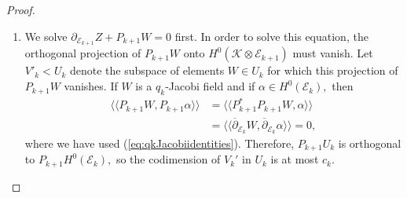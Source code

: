 \documentclass[10pt,a4paper]{amsart}
\newcommand{\delbar}{\overline{\partial}}
\newcommand{\del}{\partial}
\newcommand{\llangle}{\langle\!\langle}
\newcommand{\rrangle}{\rangle\!\rangle}
\begin{document}
\begin{proof}
\begin{enumerate}[label=(\alph*)]
        For $Z \in U_{k+1}',$ choose the solution $W$ of $\delbar_{\mathcal{E}_{k}} W - P^\dagger_{k+1} Z = 0$ with $W \in \ker(\delbar_{\mathcal{E}_{k}} )^\perp$ and let $Y = \del_{\mathcal{E}_{k+1}} Z + P_{k+1} W.$ Proposition \ref{prop:commutident} and (\ref{eq:qkJacobiidentities}) give
        \begin{equation*}
            \begin{aligned}
                \del^*_{\mathcal{E}_{k+1}} Y &= \del^*_{\mathcal{E}_{k+1}} \del_{\mathcal{E}_{k+1}} Z + \del^*_{\mathcal{E}_{k+1}} P_{k+1} W \\
                &= (P_{k+1}^\dagger)^* P_{k+1}^\dagger Z + \del^*_{\mathcal{E}_{k+1}} P_{k+1} W \\
                &= \left( (P_{k+1}^\dagger)^* \delbar_{\mathcal{E}_{k}} + \del^*_{\mathcal{E}_{k+1}} P_{k+1} \right) W = 0,
            \end{aligned}
        \end{equation*}
        so $Y \in H^0(\mathcal{K} \otimes \mathcal{E}_{k+1}).$ Replacing $W$ by $W+\tau$ with $\tau \in H^0(\mathcal{E}_k)$ changes $Y$ by $P_{k+1} \tau.$ Let $U''_{k+1}$ denote the subspace of $U_{k+1}'$ for which the class of $Y$ in ${H^0(\mathcal{K} \otimes \mathcal{E}_{k+1})}/{P_{k+1} H^0(\mathcal{E}_k)}$ is $0.$ The codimension of $U''_{k+1}$ in $U'_{k+1}$ is at most $c_k.$ Given $Z \in U_{k+1}'',$ we can find $W' \in \Gamma(\mathcal{E}_k)$ satisfying both equations in (\ref{eq:nullityextension}), unique up to an element in $\ker(\delbar_{\mathcal{E}_k}) \cap \ker(P_{k+1}) = H^0(\mathcal{A}_k).$ Therefore, by Lemma \ref{lem:ckdkcalc},
        \begin{equation}
            \nu_k \geq \nu_{k+1} - c_k - d_k + h^0(\mathcal{A}_k) = \nu_{k+1} + \chi(\mathcal{A}_k) - (n-k-1)b_{k+1}.
        \end{equation}
        
        \item We solve $\del_{\mathcal{E}_{k+1}} Z + P_{k+1} W = 0$ first. In order to solve this equation, the orthogonal projection of $P_{k+1}W$ onto $H^0(\mathcal K \otimes \mathcal E_{k+1})$ must vanish. Let $V'_{k} < U_k$ denote the subspace of elements $W \in U_k$ for which this projection of $P_{k+1}W$ vanishes. If $W$ is a $q_k$-Jacobi field and if $\alpha \in H^0(\mathcal{E}_k),$ then
        \begin{equation*}
        \begin{aligned}
             \llangle P_{k+1} W, P_{k+1} \alpha \rrangle  &= \llangle P_{k+1}^* P_{k+1} W, \alpha \rrangle \\
             &= \llangle \delbar_{\mathcal{E}_k} W, \delbar_{\mathcal{E}_k} \alpha \rrangle = 0,
        \end{aligned}
        \end{equation*}
        where we have used (\ref{eq:qkJacobiidentities}). Therefore, $P_{k+1} U_k$ is orthogonal to $P_{k+1} H^0(\mathcal{E}_k),$ so the codimension of $V_k'$ in $U_k$ is at most $c_k.$


\end{enumerate}
\end{proof}
\end{document}
